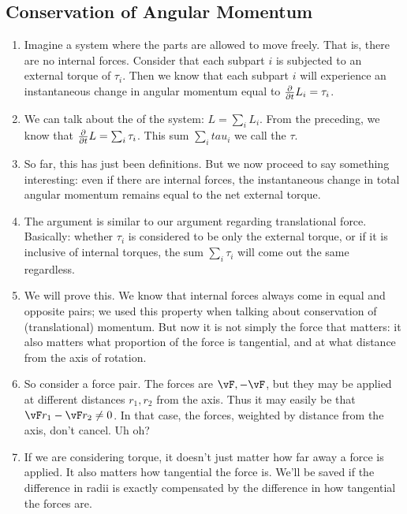 \subsection{Conservation of Angular Momentum}

\begin{enumerate}
  \item Imagine a system where the parts are allowed to move freely.
  That is, there are no internal forces. Consider that each subpart $i$
  is subjected to an external torque of $\tau_i$. Then we know that each
  subpart $i$ will experience an instantaneous change in angular
  momentum equal to $\frac{\partial }{\partial t} L_i = \tau_i$.

  \item We can talk about the  of the
  system: $L = \sum_i L_i$. From the preceding, we know that
  $\frac{\partial }{\partial t} L = \sum_i \tau_i$. This sum $\sum_i tau_i$ we call the
   $\tau$.

  \item So far, this has just been definitions. But we now proceed to
  say something interesting: even if there are internal forces, the
  instantaneous change in total angular momentum remains equal to the
  net external torque.

  \item The argument is similar to our argument regarding translational
  force. Basically: whether $\tau_i$ is considered to be only the
  external torque, or if it is inclusive of internal torques, the sum
  $\sum_i \tau_i$ will come out the same regardless.

  \item We will prove this. We know that internal forces always come in
  equal and opposite pairs; we used this property when talking about
  conservation of (translational) momentum. But now it is not simply the
  force that matters: it also matters what proportion of the force is
  tangential, and at what distance from the axis of rotation.

  \item So consider a force pair. The forces are $\vF, -\vF$, but they
  may be applied at different distances $r_1, r_2$ from the axis. Thus
  it may easily be that $\vF r_1 - \vF r_2 \ne 0$. In that case, the
  forces, weighted by distance from the axis, don't cancel. Uh oh?

  \item If we are considering torque, it doesn't just matter how far
  away a force is applied. It also matters how tangential the force is.
  We'll be saved if the difference in radii is exactly compensated by
  the difference in how tangential the forces are.


\end{enumerate}
